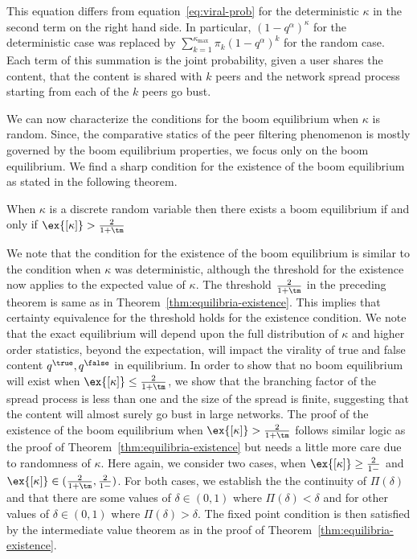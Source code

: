This equation differs from equation~\eqref{eq:viral-prob} for the deterministic $\kappa$ in the second term on the right hand side. In particular, ${\left(1-q^\alpha\right)}^\kappa$ for the deterministic case was replaced by $ \sum_{k=1}^{\kappa_{\max}} \pi_k {\left(1 - q^\alpha\right)}^k $ for the random case. Each term of this summation is the joint probability, given a user shares the content, that the content is shared with $k$ peers and the network spread process starting from each of the $k$ peers go bust. 

We can now characterize the conditions for the boom equilibrium when $\kappa$ is random. Since, the comparative statics of the peer filtering phenomenon is mostly governed by the boom equilibrium properties, we focus only on the boom equilibrium. We find a sharp condition for the existence of the boom equilibrium as stated in the following theorem.

\begin{theorem}\label{thm:non-det-kappa}
    When $\kappa $ is a discrete random variable then there exists a boom equilibrium if and only if  $\ex{[\kappa]} > \frac{2 }{1 + \tm}$
\end{theorem}

We note that the condition for the existence of the boom equilibrium is similar to the condition when $\kappa$ was deterministic, although the threshold for the existence now applies to the expected value of $\kappa$. The threshold $\frac{2}{1+ \tm}$ in the preceding theorem is same as in Theorem~\ref{thm:equilibria-existence}. This implies that certainty equivalence for the threshold holds for the existence condition. We note that the exact equilibrium will depend upon the full distribution of $\kappa$ and higher order statistics, beyond the expectation, will impact the virality of true and false content $q^\true, q^\false$ in equilibrium. In order to show that no boom equilibrium will exist when $\ex{[\kappa]} \leq \frac{2}{1+\tm}$, we show that the branching factor of the spread process is less than one and the size of the spread is finite, suggesting that the content will almost surely go bust in large networks. The proof of the existence of the boom equilibrium when $\ex{[\kappa]} > \frac{2}{1+\tm}$ follows similar logic as the proof of Theorem~\ref{thm:equilibria-existence} but needs a little more care due to randomness of $\kappa$. Here again, we consider two cases, when $\ex{[\kappa]} \geq \frac{2}{1-\tt}$ and $\ex{[\kappa]} \in (\frac{2}{1+\tm}, \frac{2}{1-\tt})$. For both cases, we establish the the continuity of $\Pi(\delta)$ and that there are some values of $\delta \in (0, 1) $ where $\Pi(\delta) < \delta$ and for other values of $\delta \in (0, 1) $ where $\Pi(\delta) > \delta$. The fixed point condition is then satisfied by the intermediate value theorem as in the proof of Theorem~\ref{thm:equilibria-existence}.

